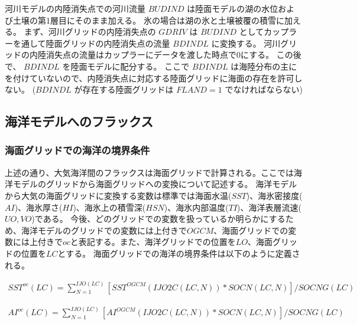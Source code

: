 河川モデルの内陸消失点での河川流量 \(BUDIND\)
は陸面モデルの湖の水位および土壌の第1層目にそのまま加える。
氷の場合は湖の氷と土壌被覆の積雪に加える。
まず、河川グリッドの内陸消失点の \(GDRIV\) は \(BUDIND\)
としてカップラーを通して陸面グリッドの内陸消失点の流量 \(BDINDL\)
に変換する。
河川グリッドの内陸消失点の流量はカップラーにデータを渡した時点で0にする。
この後で、 \(BDINDL\) を陸面モデルに配分する。 ここで \(BDINDL\)
は海陸分布の主にを付けていないので、内陸消失点に対応する陸面グリッドに海面の存在を許可しない。
(\(BDINDL\) が存在する陸面グリッドは \(FLAND=1\) でなければならない)

\hypertarget{ux6d77ux6d0bux30e2ux30c7ux30ebux3078ux306eux30d5ux30e9ux30c3ux30afux30b9}{%
\subsection{海洋モデルへのフラックス}\label{ux6d77ux6d0bux30e2ux30c7ux30ebux3078ux306eux30d5ux30e9ux30c3ux30afux30b9}}

\hypertarget{ux6d77ux9762ux30b0ux30eaux30c3ux30c9ux3067ux306eux6d77ux6d0bux306eux5883ux754cux6761ux4ef6}{%
\subsubsection{海面グリッドでの海洋の境界条件}\label{ux6d77ux9762ux30b0ux30eaux30c3ux30c9ux3067ux306eux6d77ux6d0bux306eux5883ux754cux6761ux4ef6}}

上述の通り、大気海洋間のフラックスは海面グリッドで計算される。ここでは海洋モデルのグリッドから海面グリッドへの変換について記述する。
海洋モデルから大気の海面グリッドに変換する変数は標準では海面水温(\(SST\))、海氷密接度(\(AI\))、海氷厚さ(\(HI\))、海氷上の積雪深(\(HSN\))、海氷内部温度(\(TI\))、海洋表層流速(\(UO,VO\))である。
今後、どのグリッドでの変数を扱っているか明らかにするため、海洋モデルのグリッドでの変数には上付きで\(OGCM\)、海面グリッドでの変数には上付きで\(oc\)と表記する。また、海洋グリッドでの位置を\(LO\)、海面グリッドの位置を\(LC\)とする。
海面グリッドでの海洋の境界条件は以下のように定義される。

\begin{eqnarray} SST^{oc}(LC) = \sum_{N=1}^{IJO(LC)}[SST^{OGCM}(IJO2C(LC,N))*SOCN(LC,N)]/SOCNG(LC) \end{eqnarray}

\begin{eqnarray} AI^{oc}(LC) = \sum_{N=1}^{IJO(LC)}[AI^{OGCM}(IJO2C(LC,N))*SOCN(LC,N)]/SOCNG(LC) \end{eqnarray}

